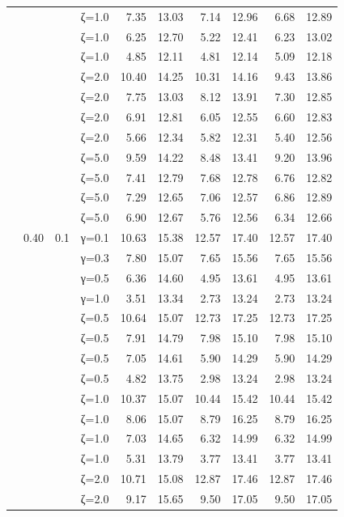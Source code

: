 \begin{table}[htbp]
\begin{tabular}{ll r l  rr  rr  rr}
  &  &  & ζ=1.0 & 7.35 & 13.03 & 7.14 & 12.96 & 6.68 & 12.89 \\
  &  &  & ζ=1.0 & 6.25 & 12.70 & 5.22 & 12.41 & 6.23 & 13.02 \\
  &  &  & ζ=1.0 & 4.85 & 12.11 & 4.81 & 12.14 & 5.09 & 12.18 \\
  &  &  & ζ=2.0 & 10.40 & 14.25 & 10.31 & 14.16 & 9.43 & 13.86 \\
  &  &  & ζ=2.0 & 7.75 & 13.03 & 8.12 & 13.91 & 7.30 & 12.85 \\
  &  &  & ζ=2.0 & 6.91 & 12.81 & 6.05 & 12.55 & 6.60 & 12.83 \\
  &  &  & ζ=2.0 & 5.66 & 12.34 & 5.82 & 12.31 & 5.40 & 12.56 \\
  &  &  & ζ=5.0 & 9.59 & 14.22 & 8.48 & 13.41 & 9.20 & 13.96 \\
  &  &  & ζ=5.0 & 7.41 & 12.79 & 7.68 & 12.78 & 6.76 & 12.82 \\
  &  &  & ζ=5.0 & 7.29 & 12.65 & 7.06 & 12.57 & 6.86 & 12.89 \\
  &  &  & ζ=5.0 & 6.90 & 12.67 & 5.76 & 12.56 & 6.34 & 12.66 \\
  & 0.40 & 0.1 & γ=0.1 & 10.63 & 15.38 & 12.57 & 17.40 & 12.57 & 17.40 \\
  &  &  & γ=0.3 & 7.80 & 15.07 & 7.65 & 15.56 & 7.65 & 15.56 \\
  &  &  & γ=0.5 & 6.36 & 14.60 & 4.95 & 13.61 & 4.95 & 13.61 \\
  &  &  & γ=1.0 & 3.51 & 13.34 & 2.73 & 13.24 & 2.73 & 13.24 \\
  &  &  & ζ=0.5 & 10.64 & 15.07 & 12.73 & 17.25 & 12.73 & 17.25 \\
  &  &  & ζ=0.5 & 7.91 & 14.79 & 7.98 & 15.10 & 7.98 & 15.10 \\
  &  &  & ζ=0.5 & 7.05 & 14.61 & 5.90 & 14.29 & 5.90 & 14.29 \\
  &  &  & ζ=0.5 & 4.82 & 13.75 & 2.98 & 13.24 & 2.98 & 13.24 \\
  &  &  & ζ=1.0 & 10.37 & 15.07 & 10.44 & 15.42 & 10.44 & 15.42 \\
  &  &  & ζ=1.0 & 8.06 & 15.07 & 8.79 & 16.25 & 8.79 & 16.25 \\
  &  &  & ζ=1.0 & 7.03 & 14.65 & 6.32 & 14.99 & 6.32 & 14.99 \\
  &  &  & ζ=1.0 & 5.31 & 13.79 & 3.77 & 13.41 & 3.77 & 13.41 \\
  &  &  & ζ=2.0 & 10.71 & 15.08 & 12.87 & 17.46 & 12.87 & 17.46 \\
  &  &  & ζ=2.0 & 9.17 & 15.65 & 9.50 & 17.05 & 9.50 & 17.05 \\

\end{tabular}
\end{table}
